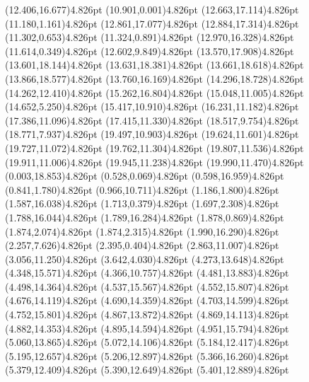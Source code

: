 \documentclass[10pt]{article}
\begin{document}
{{\qdisk(12.406,16.677){4.826pt}%
\qdisk(10.901,0.001){4.826pt}%
\qdisk(12.663,17.114){4.826pt}%
\qdisk(11.180,1.161){4.826pt}%
\qdisk(12.861,17.077){4.826pt}%
\qdisk(12.884,17.314){4.826pt}%
\qdisk(11.302,0.653){4.826pt}%
\qdisk(11.324,0.891){4.826pt}%
\qdisk(12.970,16.328){4.826pt}%
\qdisk(11.614,0.349){4.826pt}%
\qdisk(12.602,9.849){4.826pt}%
\qdisk(13.570,17.908){4.826pt}%
\qdisk(13.601,18.144){4.826pt}%
\qdisk(13.631,18.381){4.826pt}%
\qdisk(13.661,18.618){4.826pt}%
\qdisk(13.866,18.577){4.826pt}%
\qdisk(13.760,16.169){4.826pt}%
\qdisk(14.296,18.728){4.826pt}%
\qdisk(14.262,12.410){4.826pt}%
\qdisk(15.262,16.804){4.826pt}%
\qdisk(15.048,11.005){4.826pt}%
\qdisk(14.652,5.250){4.826pt}%
\qdisk(15.417,10.910){4.826pt}%
\qdisk(16.231,11.182){4.826pt}%
\qdisk(17.386,11.096){4.826pt}%
\qdisk(17.415,11.330){4.826pt}%
\qdisk(18.517,9.754){4.826pt}%
\qdisk(18.771,7.937){4.826pt}%
\qdisk(19.497,10.903){4.826pt}%
\qdisk(19.624,11.601){4.826pt}%
\qdisk(19.727,11.072){4.826pt}%
\qdisk(19.762,11.304){4.826pt}%
\qdisk(19.807,11.536){4.826pt}%
\qdisk(19.911,11.006){4.826pt}%
\qdisk(19.945,11.238){4.826pt}%
\qdisk(19.990,11.470){4.826pt}%
\dummycolor
\qdisk(0.003,18.853){4.826pt}%
\qdisk(0.528,0.069){4.826pt}%
\qdisk(0.598,16.959){4.826pt}%
\qdisk(0.841,1.780){4.826pt}%
\qdisk(0.966,10.711){4.826pt}%
\qdisk(1.186,1.800){4.826pt}%
\qdisk(1.587,16.038){4.826pt}%
\qdisk(1.713,0.379){4.826pt}%
\qdisk(1.697,2.308){4.826pt}%
\qdisk(1.788,16.044){4.826pt}%
\qdisk(1.789,16.284){4.826pt}%
\qdisk(1.878,0.869){4.826pt}%
\qdisk(1.874,2.074){4.826pt}%
\qdisk(1.874,2.315){4.826pt}%
\qdisk(1.990,16.290){4.826pt}%
\qdisk(2.257,7.626){4.826pt}%
\qdisk(2.395,0.404){4.826pt}%
\qdisk(2.863,11.007){4.826pt}%
\qdisk(3.056,11.250){4.826pt}%
\qdisk(3.642,4.030){4.826pt}%
\qdisk(4.273,13.648){4.826pt}%
\qdisk(4.348,15.571){4.826pt}%
\qdisk(4.366,10.757){4.826pt}%
\qdisk(4.481,13.883){4.826pt}%
\qdisk(4.498,14.364){4.826pt}%
\qdisk(4.537,15.567){4.826pt}%
\qdisk(4.552,15.807){4.826pt}%
\qdisk(4.676,14.119){4.826pt}%
\qdisk(4.690,14.359){4.826pt}%
\qdisk(4.703,14.599){4.826pt}%
\qdisk(4.752,15.801){4.826pt}%
\qdisk(4.867,13.872){4.826pt}%
\qdisk(4.869,14.113){4.826pt}%
\qdisk(4.882,14.353){4.826pt}%
\qdisk(4.895,14.594){4.826pt}%
\qdisk(4.951,15.794){4.826pt}%
\qdisk(5.060,13.865){4.826pt}%
\qdisk(5.072,14.106){4.826pt}%
\qdisk(5.184,12.417){4.826pt}%
\qdisk(5.195,12.657){4.826pt}%
\qdisk(5.206,12.897){4.826pt}%
\qdisk(5.366,16.260){4.826pt}%
\qdisk(5.379,12.409){4.826pt}%
\qdisk(5.390,12.649){4.826pt}%
\qdisk(5.401,12.889){4.826pt}%
}}
\end{document}
